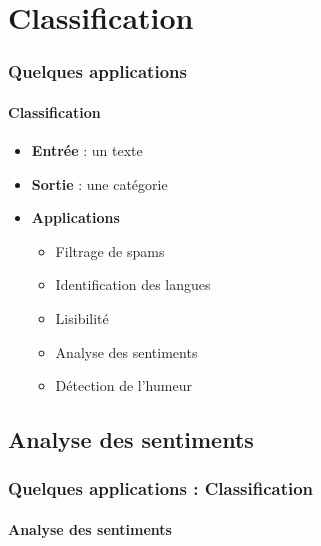 \documentclass[xcolor=table]{beamer}
\begin{document}
\section{Classification}

\begin{frame}
	\frametitle{Quelques applications}
	\framesubtitle{Classification}
	
	\begin{itemize}
		\item \textbf{Entrée} : un texte
		\item \textbf{Sortie} : une catégorie
		\item \textbf{Applications} 
		\begin{itemize}
			\item Filtrage de spams
			\item Identification des langues
			\item Lisibilité 
			\item Analyse des sentiments
			\item Détection de l'humeur
		\end{itemize}
	\end{itemize}

\end{frame}

\subsection{Analyse des sentiments}

\begin{frame}
	\frametitle{Quelques applications : Classification}
	\framesubtitle{Analyse des sentiments}
\end{frame}
\end{document}
